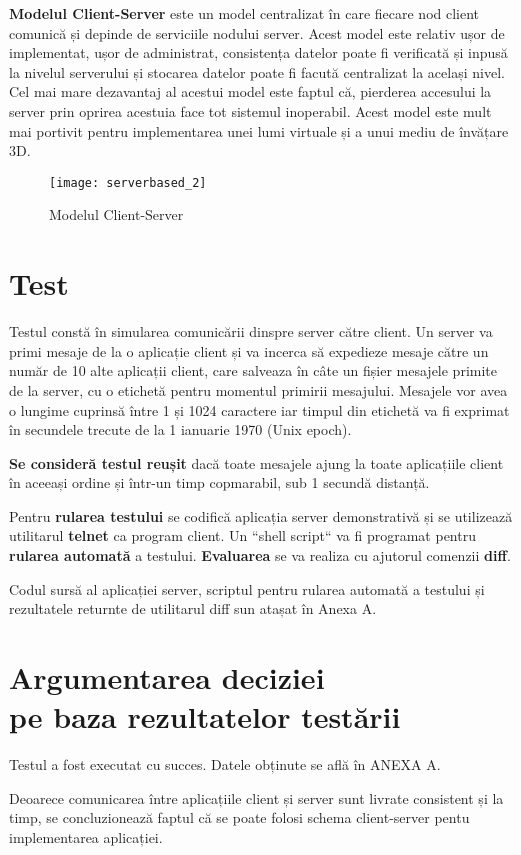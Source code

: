 \textbf{Modelul Client-Server} este un model centralizat în care fiecare nod client comunică și depinde de serviciile nodului server. Acest model este relativ ușor de implementat, ușor de administrat, consistența datelor poate fi verificată și inpusă la nivelul serverului și stocarea datelor poate fi facută centralizat la același nivel. Cel mai mare dezavantaj al acestui model este faptul că, pierderea accesului la server prin oprirea acestuia face tot sistemul inoperabil. Acest model este mult mai portivit pentru implementarea unei lumi virtuale și a unui mediu de învățare 3D. 

\begin{figure}[h]
    \centering
    \texttt{[image: serverbased\_2]}
    \caption{Modelul Client-Server}
    \label{fig:imag5}
\end{figure}

\section{Test}

\par Testul constă în simularea comunicării dinspre server către client. Un server va primi mesaje de la o aplicație  client și va incerca să expedieze mesaje către un număr de 10 alte aplicații client, care salveaza în câte un fișier mesajele primite de la server, cu o etichetă pentru momentul primirii mesajului. Mesajele vor avea o lungime cuprinsă între 1 și 1024 caractere iar timpul din etichetă va fi exprimat în secundele trecute de la 1 ianuarie 1970  (Unix epoch).

\par \textbf{Se consideră testul reușit} dacă toate mesajele ajung la toate aplicațiile client în aceeași ordine și într-un timp copmarabil, sub 1 secundă distanță.
\par Pentru \textbf{rularea testului} se codifică aplicația  server demonstrativă și se utilizează utilitarul \textbf{telnet} ca program client. Un ``shell script`` va fi programat pentru \textbf{rularea automată} a testului. \textbf{Evaluarea} se va realiza cu ajutorul comenzii \textbf{diff}. 
\par Codul sursă al aplicației server, scriptul pentru rularea automată a testului și rezultatele returnte de utilitarul diff sun atașat în Anexa A.

\section{Argumentarea deciziei \\ pe baza rezultatelor testării}

\par Testul a fost executat cu succes. Datele obținute se află în ANEXA A.
\par Deoarece comunicarea între aplicațiile client și server sunt livrate consistent și la timp, se concluzionează faptul că se poate folosi schema client-server pentu implementarea aplicației.
